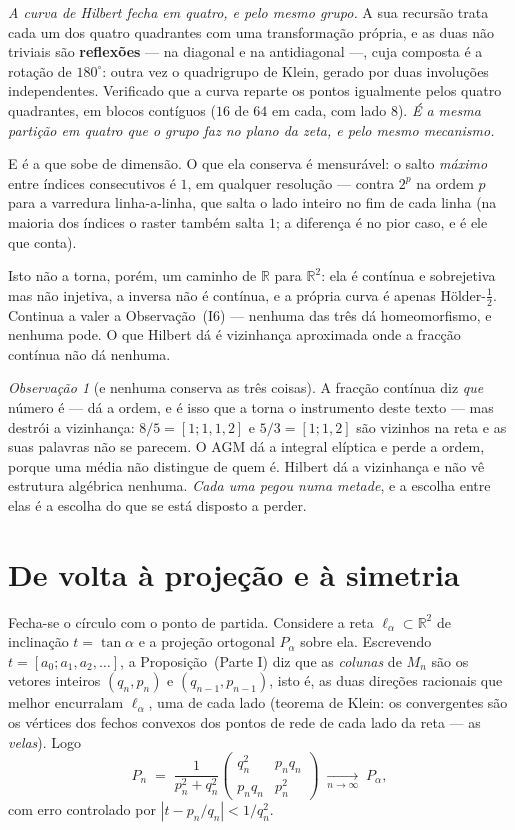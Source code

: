 \documentclass[11pt,a4paper]{article}
\theoremstyle{plain}
\theoremstyle{definition}
\theoremstyle{remark}
\newtheorem{obs}[teorema]{Observação}
\newcommand{\R}{\mathbb{R}}
\newcommand{\cf}[2]{[#1;#2]}
\begin{document}
\emph{A curva de Hilbert fecha em quatro, e pelo mesmo grupo.} A sua recursão trata cada um dos
quatro quadrantes com uma transformação própria, e as duas não triviais são \textbf{reflexões} ---
na diagonal e na antidiagonal ---, cuja composta é a rotação de $180^\circ$: outra vez o
quadrigrupo de Klein, gerado por duas involuções independentes. Verificado que a curva reparte os
pontos igualmente pelos quatro quadrantes, em blocos contíguos ($16$ de $64$ em cada, com lado
$8$). \emph{É a mesma partição em quatro que o grupo faz no plano da zeta, e pelo mesmo mecanismo.}

E é a que sobe de dimensão. O que ela conserva é mensurável: o salto
\emph{máximo} entre índices consecutivos é $1$, em qualquer resolução --- contra $2^p$ na ordem $p$
para a varredura linha-a-linha, que salta o lado inteiro no fim de cada linha (na maioria dos
índices o raster também salta $1$; a diferença é no pior caso, e é ele que conta).

Isto não a torna, porém, um caminho de $\R$ para $\R^2$: ela é contínua e sobrejetiva mas não
injetiva, a inversa não é contínua, e a própria curva é apenas Hölder-$\tfrac12$. Continua a valer
a Observação~(I6) --- nenhuma das três dá homeomorfismo, e nenhuma pode. O que
Hilbert dá é vizinhança aproximada onde a fracção contínua não dá nenhuma.

\begin{obs}[e nenhuma conserva as três coisas]
A fracção contínua diz \emph{que} número é --- dá a ordem, e é isso que a torna o instrumento deste
texto --- mas destrói a vizinhança: $8/5 = [1;1,1,2]$ e $5/3 = [1;1,2]$ são vizinhos na reta e as
suas palavras não se parecem. O AGM dá a integral elíptica e perde a ordem, porque uma média não distingue
de quem é. Hilbert dá a vizinhança e não vê estrutura algébrica nenhuma. \emph{Cada uma pegou numa
metade}, e a escolha entre elas é a escolha do que se está disposto a perder.
\end{obs}


\section{De volta à projeção e à simetria}\label{sec:proj}

Fecha-se o círculo com o ponto de partida. Considere a reta $\ell_\alpha \subset \R^2$ de
inclinação $t=\tan\alpha$ e a projeção ortogonal $P_\alpha$ sobre ela. Escrevendo
$t = \cf{a_0}{a_1,a_2,\dots}$, a Proposição~(Parte I) diz que as \emph{colunas} de $M_n$
são os vetores inteiros $(q_n,p_n)$ e $(q_{n-1},p_{n-1})$, isto é, as duas direções racionais que
melhor encurralam $\ell_\alpha$, uma de cada lado (teorema de Klein: os convergentes são os
vértices dos fechos convexos dos pontos de rede de cada lado da reta --- as \emph{velas}). Logo
\[
  P_n \;=\; \frac{1}{p_n^2+q_n^2}\begin{pmatrix} q_n^2 & p_nq_n\\ p_nq_n & p_n^2\end{pmatrix}
  \;\xrightarrow[n\to\infty]{}\; P_\alpha,
\]
com erro controlado por $|t - p_n/q_n| < 1/q_n^2$.
\end{document}

